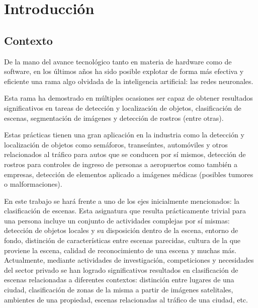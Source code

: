 
\section{Introducción}
\subsection{Contexto}
De la mano del avance tecnológico tanto en materia de hardware como de software, en los últimos años ha sido posible explotar de forma más efectiva y eficiente una rama algo olvidada de la inteligencia artificial: las redes neuronales.


Esta rama ha demostrado en múltiples ocasiones ser capaz de obtener resultados significativos en tareas de detección y localización de objetos, clasificación de escenas, segmentación de imágenes y detección de rostros (entre otras). 



Estas prácticas tienen una gran aplicación en la industria como la detección y localización de objetos como semáforos, transeúntes, automóviles y otros relacionados al tráfico para autos que se conducen por sí mismos, detección de rostros para controles de ingreso de personas a aeropuertos como también a empresas, detección de elementos aplicado a imágenes médicas (posibles tumores o malformaciones).



En este trabajo se hará frente a uno de los ejes inicialmente mencionados: la clasificación de escenas. Esta asignatura que resulta prácticamente trivial para una persona incluye un conjunto de actividades complejas por sí mismas: detección de objetos locales y su disposición dentro de la escena, entorno de fondo, distinción de características entre escenas parecidas, cultura de la que proviene la escena, calidad de reconocimiento de una escena y muchas más. Actualmente, mediante actividades de investigación, competiciones y necesidades del sector privado se han logrado significativos resultados en clasificación de escenas relacionadas a diferentes contextos: distinción entre lugares de una ciudad, clasificación de zonas de la misma a partir de imágenes satelitales, ambientes de una propiedad, escenas relacionadas al tráfico de una ciudad, etc.

